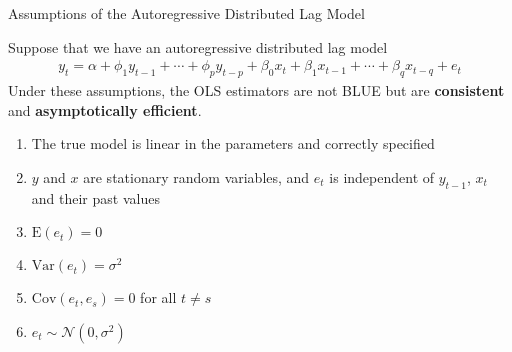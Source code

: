 \documentclass[10pt,aspectratio=169]{beamer}  %
\begin{document}

\begin{frame}{Assumptions of the Autoregressive Distributed Lag Model}

    \bigskip
    Suppose that we have an autoregressive distributed lag model
    \begin{align*}
        y_{t} = \alpha + \phi_{1} y_{t-1} + \cdots + \phi_{p} y_{t-p} + \beta_{0} x_{t} + \beta_{1} x_{t-1} + \cdots + \beta_{q} x_{t-q} + e_{t}
    \end{align*}
    Under these assumptions, the OLS estimators are not BLUE but are \textbf{consistent} and \textbf{asymptotically efficient}.

    \smallskip
    \begin{tcolorbox}[colframe=MyColor!80, title=Assumptions of the Autoregressive Distributed Lag model]
        \begin{enumerate}
            \item The true model is linear in the parameters and correctly specified
            \item $ y $ and $ x $ are stationary random variables, and $ e_{t} $ is independent of $ y_{t-1} $, $ x_{t} $ and their past values
            \item $ \mathrm{E}(e_{t}) = 0 $
            \item $ \mathrm{Var}(e_{t}) = \sigma^2 $
            \item $ \mathrm{Cov}(e_{t}, e_{s}) = 0 $ for all $ t \neq s $
            \item $ e_{t} \sim \mathcal{N}(0, \sigma^2) $
        \end{enumerate}
    \end{tcolorbox}

\end{frame}

\end{document}
